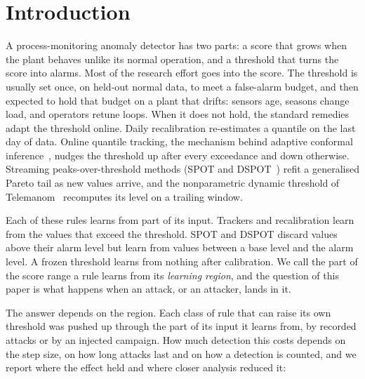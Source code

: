 \documentclass[letterpaper,twocolumn,10pt]{article}
\begin{document}
\section{Introduction}

A process-monitoring anomaly detector has two parts: a score that grows when the plant behaves
unlike its normal operation, and a threshold that turns the score into alarms. Most of the
research effort goes into the score. The threshold is usually set once, on held-out normal data,
to meet a false-alarm budget, and then expected to hold that budget on a plant that drifts:
sensors age, seasons change load, and operators retune loops. When it does not hold, the standard
remedies adapt the threshold online. Daily recalibration re-estimates a quantile on the last day
of data. Online quantile tracking, the mechanism behind adaptive conformal
inference~\cite{gibbs2021aci}, nudges the threshold up after every exceedance and down otherwise.
Streaming peaks-over-threshold methods (SPOT and DSPOT~\cite{siffer2017spot}) refit a generalised
Pareto tail as new values arrive, and the nonparametric dynamic threshold of
Telemanom~\cite{hundman2018telemanom} recomputes its level on a trailing window.

Each of these rules learns from part of its input. Trackers and recalibration learn from the
values that exceed the threshold. SPOT and DSPOT discard values above their alarm level but learn
from values between a base level and the alarm level. A frozen threshold learns from nothing after
calibration. We call the part of the score range a rule learns from its \emph{learning region},
and the question of this paper is what happens when an attack, or an attacker, lands in it.

The answer depends on the region. Each class of rule that can raise its own threshold was pushed up
through the part of its input it learns from, by recorded attacks or by an injected campaign. How much
detection this costs depends on the step size, on how long attacks last and on how a detection is
counted, and we report where the effect held and where closer analysis reduced it:
\end{document}
